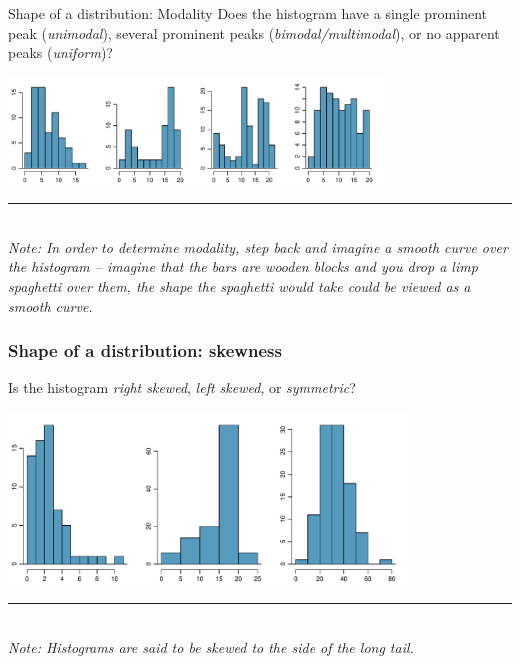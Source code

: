 \documentclass[notes,11pt, aspectratio=169]{beamer}
\newcommand{\Note}[1]{
\rule{2.5cm}{0.25pt} \\ \textit{\footnotesize{\textcolor{rubineRed}{Note:} \textcolor{darkerGray}{#1}}}}
\newcommand{\hl}[1]{\textit{\textcolor{hlblue}{#1}}}
\begin{document}
\begin{frame}{Shape of a distribution: Modality}
Does the histogram have a single prominent peak (\hl{unimodal}), several prominent peaks (\hl{bimodal/multimodal}), or no apparent peaks (\hl{uniform})?

\begin{center}
\includegraphics[width=0.75\textwidth]{graphs/l02f06}
\end{center}

\Note{In order to determine modality, step back and imagine a smooth curve over the histogram -- imagine that the bars are wooden blocks and you drop a limp spaghetti over them, the shape the spaghetti would take could be viewed as a smooth curve.}
\end{frame}


\begin{frame}
\frametitle{Shape of a distribution: skewness}

Is the histogram \hl{right skewed}, \hl{left skewed}, or \hl{symmetric}?

\begin{center}
\includegraphics[width=0.8\textwidth]{graphs/l02f07.pdf}
\end{center}

\Note{Histograms are said to be skewed to the side of the long tail.}

\end{frame}
\end{document}
